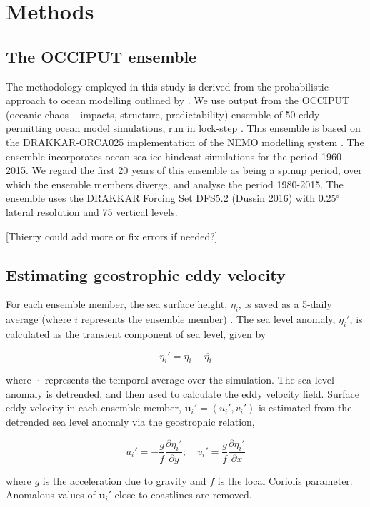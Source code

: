 \documentclass{agujournal2019}
\newcommand{\andycomment}[1]{{\color{blue} [#1]}}
\begin{document}
\section{Methods}

\subsection{The OCCIPUT ensemble}

The methodology employed in this study is derived from the probabilistic approach to ocean modelling outlined by \citet{Bessieres2017}.
We use output from the OCCIPUT (oceanic chaos – impacts, structure, predictability) ensemble of 50 eddy-permitting ocean model simulations, run in lock-step \citep{Leroux2018}.
This ensemble is based on the DRAKKAR-ORCA025 \citep[e.g.][]{Barnier2006} implementation of the NEMO modelling system \citep{Madec2012}.
The ensemble incorporates ocean-sea ice hindcast simulations for the period 1960-2015.
We regard the first 20 years of this ensemble as being a spinup period, over which the ensemble members diverge, and analyse the period 1980-2015.
The ensemble uses the DRAKKAR Forcing Set DFS5.2 (Dussin 2016) with  0.25$^\circ$ lateral resolution and 75 vertical levels.

\andycomment{Thierry could add more or fix errors if needed?}


\subsection{Estimating geostrophic eddy velocity}
For each ensemble member, the sea surface height, $\eta_i$, is saved as a 5-daily average (where $i$ represents the ensemble member) . 
The sea level anomaly, $\eta_i'$, is calculated as the transient component of sea level, given by 
\begin{linenomath*}
\begin{equation}
\eta_i' = \eta_i - \overline{\eta_i}
\end{equation}
\end{linenomath*}
where $\overline{\cdot}$ represents the temporal average over the simulation.
The sea level anomaly is detrended, and then used to calculate the eddy velocity field.
Surface eddy velocity in each ensemble member, $\mathbf{u}_i' = (u_i', v_i')$ is estimated from the detrended sea level anomaly via the geostrophic relation,
\begin{linenomath*}
\begin{equation}
u_i' = - \frac{g}{f} \frac{\partial \eta_i'}{\partial y}; \quad v_i' = \frac{g}{f} \frac{\partial \eta_i'}{\partial x}
\end{equation}
\end{linenomath*}
where $g$ is the acceleration due to gravity and $f$ is the local Coriolis parameter.
Anomalous values of $\mathbf{u}_i'$ close to coastlines are removed.
\end{document}
